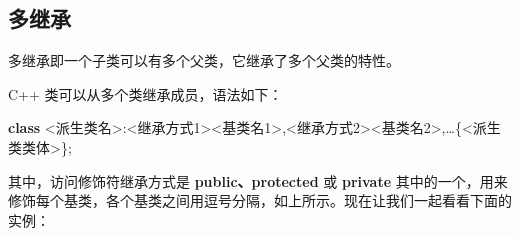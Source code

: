 \documentclass[
]{article}
\newenvironment{Shaded}{}{}
\newcommand{\DecValTok}[1]{\textcolor[rgb]{0.25,0.63,0.44}{#1}}
\newcommand{\KeywordTok}[1]{\textcolor[rgb]{0.00,0.44,0.13}{\textbf{#1}}}
\newcommand{\NormalTok}[1]{#1}
\newcommand{\OperatorTok}[1]{\textcolor[rgb]{0.40,0.40,0.40}{#1}}
\begin{document}
\hypertarget{ux591aux7ee7ux627f}{%
\subsection{多继承}\label{ux591aux7ee7ux627f}}

多继承即一个子类可以有多个父类，它继承了多个父类的特性。

C++ 类可以从多个类继承成员，语法如下：

\begin{Shaded}
\begin{Highlighting}[]
\KeywordTok{class} \OperatorTok{\textless{}}\NormalTok{派生类名}\OperatorTok{\textgreater{}:\textless{}}\NormalTok{继承方式}\DecValTok{1}\OperatorTok{\textgreater{}\textless{}}\NormalTok{基类名}\DecValTok{1}\OperatorTok{\textgreater{},\textless{}}\NormalTok{继承方式}\DecValTok{2}\OperatorTok{\textgreater{}\textless{}}\NormalTok{基类名}\DecValTok{2}\OperatorTok{\textgreater{},}\NormalTok{…}\OperatorTok{\{\textless{}}\NormalTok{派生类类体}\OperatorTok{\textgreater{}\};}
\end{Highlighting}
\end{Shaded}

其中，访问修饰符继承方式是 \textbf{public、protected} 或
\textbf{private}
其中的一个，用来修饰每个基类，各个基类之间用逗号分隔，如上所示。现在让我们一起看看下面的实例：
\end{document}

